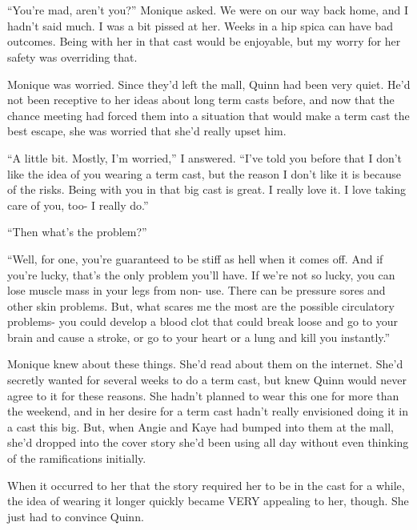 \chapter{}
``You're mad, aren't you?'' Monique asked. We were on our way back home, and I hadn't said
much. I was a bit pissed at her. Weeks in a hip spica can have bad outcomes. Being with her in
that cast would be enjoyable, but my worry for her safety was overriding that.

\begin{thought}
Monique was worried. Since they'd left the mall, Quinn had been very quiet. He'd not been
receptive to her ideas about long term casts before, and now that the chance meeting had forced
them into a situation that would make a term cast the best escape, she was worried that she'd
really upset him.
\end{thought}

``A little bit. Mostly, I'm worried,'' I answered. ``I've told you before that I don't like
the idea of you wearing a term cast, but the reason I don't like it is because of the risks.
Being with you in that big cast is great. I really love it. I love taking care of you, too- I
really do.''

``Then what's the problem?''

``Well, for one, you're guaranteed to be stiff as hell when it comes off. And if you're
lucky, that's the only problem you'll have. If we're not so lucky, you can lose muscle mass in
your legs from non- use. There can be pressure sores and other skin problems. But, what scares
me the most are the possible circulatory problems- you could develop a blood clot that could
break loose and go to your brain and cause a stroke, or go to your heart or a lung and kill you
instantly.''

\begin{thought}
Monique knew about these things. She'd read about them on the internet. She'd secretly
wanted for several weeks to do a term cast, but knew Quinn would never agree to it for these
reasons. She hadn't planned to wear this one for more than the weekend, and in her desire for a
term cast hadn't really envisioned doing it in a cast this big. But, when Angie and Kaye had
bumped into them at the mall, she'd dropped into the cover story she'd been using all day
without even thinking of the ramifications initially.

When it occurred to her that the story required her to be in the cast for a while, the idea
of wearing it longer quickly became VERY appealing to her, though. She just had to convince
Quinn.
\end{thought}

